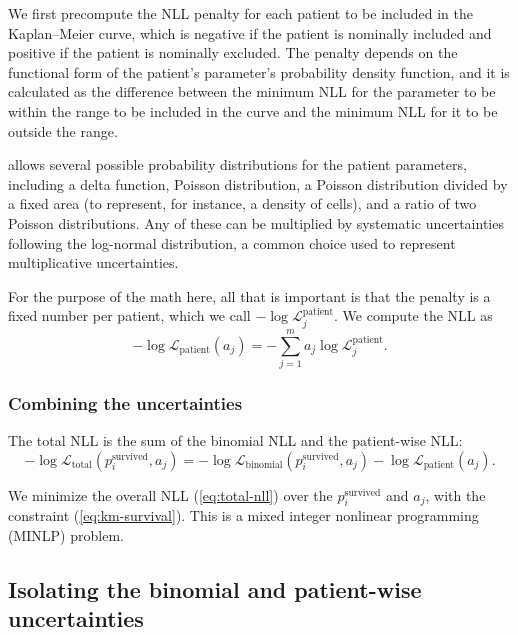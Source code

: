 \documentclass[article]{jss}
\newcommand{\KM}{Kaplan--Meier} %
\begin{document}
We first precompute the NLL penalty for each patient to be included in the \KM{} curve, which is negative if the patient is nominally included and positive if the patient is nominally excluded. The penalty depends on the functional form of the patient's parameter's probability density function, and it is calculated as the difference between the minimum NLL for the parameter to be within the range to be included in the curve and the minimum NLL for it to be outside the range.

 allows several possible probability distributions for the patient parameters, including a delta function, Poisson distribution, a Poisson distribution divided by a fixed area (to represent, for instance, a density of cells), and a ratio of two Poisson distributions. Any of these can be multiplied by systematic uncertainties following the log-normal distribution, a common choice used to represent multiplicative uncertainties.

For the purpose of the math here, all that is important is that the penalty is a fixed number per patient, which we call \(-\log \mathcal{L}_j^{\text{patient}}\). We compute the NLL as
\begin{equation}
-\log \mathcal{L}_{\text{patient}}(a_j) = -\sum_{j=1}^{m} a_j\log \mathcal{L}_j^{\text{patient}}. \label{eq:patient-nll}
\end{equation}

\subsubsection{Combining the uncertainties}\label{sec:combining-uncertainties}

The total NLL is the sum of the binomial NLL and the patient-wise NLL\@:
\begin{equation}
-\log \mathcal{L}_{\text{total}}(p_i^\text{survived}, a_j) = -\log \mathcal{L}_{\text{binomial}}(p_i^\text{survived}, a_j) - \log \mathcal{L}_{\text{patient}}(a_j). \label{eq:total-nll}
\end{equation}

We minimize the overall NLL (\ref{eq:total-nll}) over the \(p_i^\text{survived}\) and \(a_j\), with the constraint (\ref{eq:km-survival}). This is a mixed integer nonlinear programming (MINLP) problem.

\subsection{Isolating the binomial and patient-wise uncertainties}\label{sec:isolating-uncertainties}
\end{document}
